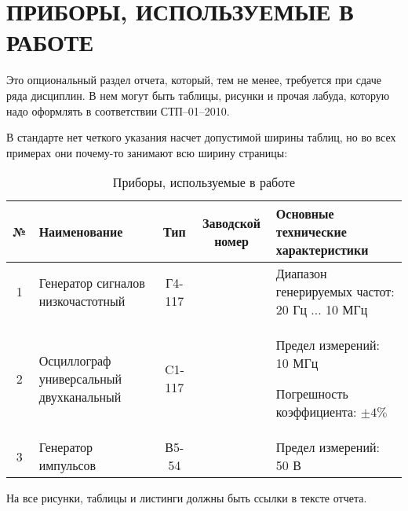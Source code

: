 \section{ПРИБОРЫ, ИСПОЛЬЗУЕМЫЕ В РАБОТЕ}

Это опциональный раздел отчета, который, тем не менее, требуется при сдаче ряда дисциплин.
В нем могут быть таблицы, рисунки и прочая лабуда, которую надо оформлять в соответствии СТП–01–2010.

В стандарте нет четкого указания насчет допустимой ширины таблиц, но во всех примерах они почему-то 
занимают всю ширину страницы:

\begin{table}[h!]
  \caption{Приборы, используемые в работе}
  \renewcommand{\tabcolsep}{0.7em}
  \begin{tabularx}{\textwidth}{| c | X | c | c | X |} %
  \hline
   № &  Наименование & Тип & Заводской номер & Основные технические характеристики \\ \hline

   1 & Генератор сигналов низкочастотный & Г4-117 & &
   Диапазон генерируемых частот: 20 Гц $ ... $ 10 МГц \\ \hline

   2 & Осциллограф универсальный двухканальный & C1-117 & &
   Предел измерений: 10 МГц \par
   Погрешность коэффициента: $ \pm4 \% $ \\ \hline

   3 & Генератор импульсов & В5-54 & &
   Предел измерений: 50 В \\ \hline  
  \end{tabularx}
\end{table}

На все рисунки, таблицы и листинги должны быть ссылки в тексте отчета.

\newpage